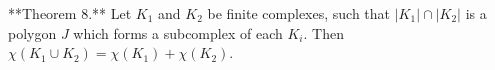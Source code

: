 **Theorem 8.** Let $K_1$ and $K_2$ be finite complexes, such that $|K_1| \cap |K_2|$ is a polygon $J$ which forms a subcomplex of each $K_i$. Then $\chi(K_1 \cup K_2) = \chi(K_1) + \chi(K_2)$.
